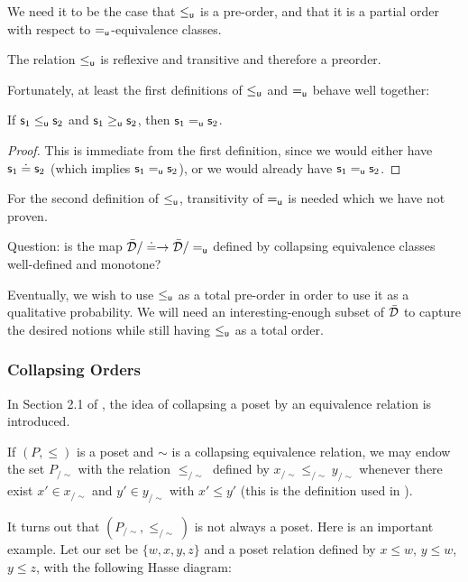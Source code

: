 \documentclass[10pt, onecolumn, longbibliography, nofootinbib]{revtex4-2}
\begin{document}
We need it to be the case that $\leq_{\mathsf{u}}$ is a pre-order, and that it is a partial order with respect to $=_{\mathsf{u}}$-equivalence classes. 

\begin{desid}
	The relation $\leq_{\mathsf{u}}$ is reflexive and transitive and therefore a preorder. 
\end{desid}

Fortunately, at least the first definitions of $\leq_{\mathsf{u}}$ and $=_{\mathsf{u}}$ behave well together:

\begin{prop}
	If $\mathsf{s}_1\leq_{\mathsf{u}}\mathsf{s}_2$ and $\mathsf{s}_1\geq_{\mathsf{u}} \mathsf{s}_2$, then $\mathsf{s}_1=_{\mathsf{u}}\mathsf{s}_2$.
\end{prop}
\begin{proof}
	This is immediate from the first definition, since we would either have $\mathsf{s}_1\doteq\mathsf{s}_2$ (which implies $\mathsf{s}_1=_{\mathsf{u}}\mathsf{s}_2$), or we would already have $\mathsf{s}_1=_{\mathsf{u}}\mathsf{s}_2$.
\end{proof}

For the second definition of $\leq_{\mathsf{u}}$, transitivity of $=_{\mathsf{u}}$ is needed which we have not proven. 

Question: is the map $\bar{\mathcal{D}} / \doteq \to \bar{\mathcal{D}} / =_{\mathsf{u}}$ defined by collapsing equivalence classes well-defined and monotone? 

Eventually, we wish to use $\leq_{\mathsf{u}}$ as a total pre-order in order to use it as a qualitative probability. We will need an interesting-enough subset of $\bar{\mathcal{D}}$ to capture the desired notions while still having $\leq_{\mathsf{u}}$ as a total order.



\subsubsection{Collapsing Orders}
In Section 2.1 of \cite{quotientposets}, the idea of collapsing a poset by an equivalence relation is introduced. 

If $(P,\leq)$ is a poset and $\sim$ is a collapsing equivalence relation, we may endow the set $P_{/\sim}$ with the relation $\leq_{/\sim}$ defined by $x_{/\sim} \leq_{/\sim} y_{/\sim}$ whenever there exist $x'\in x_{/\sim}$ and $y'\in y_{/\sim}$ with $x'\leq y'$ (this is the definition used in \cite{quotientposets}). 

It turns out that $(P_{/\sim},\leq_{/\sim})$ is not always a poset. Here is an important example. Let our set be $\{w,x,y,z\}$ and a poset relation defined by $x\leq w$, $y\leq w$, $y\leq z$, with the following Hasse diagram:
\end{document}
